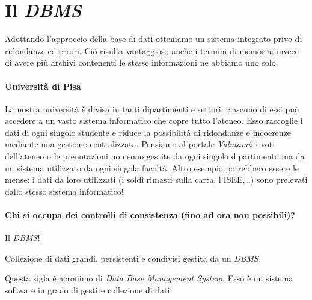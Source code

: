 \section{Il \emph{DBMS}}
Adottando l'approccio della base di dati otteniamo un sistema integrato privo di ridondanze ed errori. Ciò risulta vantaggioso anche i termini di memoria: invece di avere più archivi contenenti le stesse informazioni ne abbiamo uno solo.
\paragraph{Università di Pisa} La nostra università è divisa in tanti dipartimenti e settori: ciascuno di essi può accedere a un vasto sistema informatico che copre tutto l'ateneo. Esso raccoglie i dati di ogni singolo studente e riduce la possibilità di ridondanze e incoerenze mediante una gestione centralizzata. Pensiamo al portale \emph{Valutami}: i voti dell'ateneo o le prenotazioni non sono gestite da ogni singolo dipartimento ma da un sistema utilizzato da ogni singola facoltà. Altro esempio potrebbero essere le mense: i dati da loro utilizzati (i soldi rimasti sulla carta, l'ISEE,\dots) sono prelevati dallo stesso sistema informatico!
\paragraph{Chi si occupa dei controlli di consistenza (fino ad ora non possibili)?} Il \emph{DBMS}!
\begin{definizione}
	Collezione di dati grandi, persistenti e condivisi gestita da un \emph{DBMS}
\end{definizione}
\begin{definizione}
	Questa sigla è acronimo di \emph{Data Base Management System}. Esso è un sistema software in grado di gestire collezione di dati.
\end{definizione}
